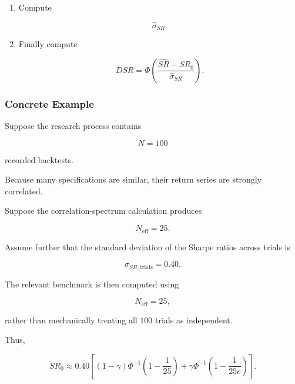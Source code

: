 \documentclass[11pt,a4paper]{article}
\begin{document}
\begin{enumerate}
    \item Compute
    
    \begin{equation}
    \widehat{\sigma}_{SR}.
    \end{equation}
    
    \item Finally compute
    
    \begin{equation}
    \boxed{
    DSR
    =
    \Phi
    \left(
    \frac{
    \widehat{SR}-SR_0
    }{
    \widehat{\sigma}_{SR}
    }
    \right).
    }
    \end{equation}
\end{enumerate}


\subsubsection{Concrete Example}

Suppose the research process contains

\begin{equation}
N=100
\end{equation}

recorded backtests.

Because many specifications are similar, their return series are strongly
correlated.

Suppose the correlation-spectrum calculation produces

\begin{equation}
N_{\mathrm{eff}}=25.
\end{equation}

Assume further that the standard deviation of the Sharpe ratios across trials is

\begin{equation}
\sigma_{SR,\mathrm{trials}}
=
0.40.
\end{equation}

The relevant benchmark is then computed using

\begin{equation}
N_{\mathrm{eff}}=25,
\end{equation}

rather than mechanically treating all $100$ trials as independent.

Thus,

\begin{equation}
SR_0
\approx
0.40
\left[
(1-\gamma)
\Phi^{-1}
\left(
1-\frac{1}{25}
\right)
+
\gamma
\Phi^{-1}
\left(
1-\frac{1}{25e}
\right)
\right].
\end{equation}
\end{document}
